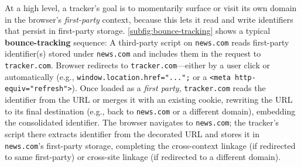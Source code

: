 At a high level, a tracker’s goal is to momentarily surface or visit its own domain in the browser’s \emph{first-party} context, because this lets it read and write identifiers that persist in first-party storage. 
%
\autoref{subfig:bounce-tracking} shows a typical \textbf{bounce-tracking} sequence:
%
 A third-party script on \texttt{news.com} reads first-party identifier(s) stored under \texttt{news.com} and
%
 includes them in the request to \texttt{tracker.com}.
%
 Browser redirects to \texttt{tracker.com}—either by a user click or automatically (e.g., \texttt{window.location.href="...";} or a \texttt{<meta http-equiv="refresh">}).
%
 Once loaded as a \emph{first party}, \texttt{tracker.com} reads the identifier from the URL or merges it with an existing cookie, rewriting the URL to its final destination (e.g., back to \texttt{news.com} or a different domain), embedding the consolidated identifier.
%
 The browser navigates to \texttt{news.com}; the tracker’s script there extracts identifier from the decorated URL and 
%
 stores it in \texttt{news.com}’s first-party storage, completing the cross-context linkage (if redirected to same first-party) or cross-site linkage (if redirected to a different domain).

